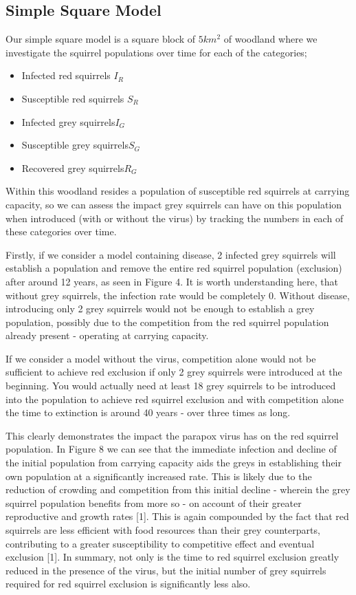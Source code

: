 \documentclass{article}
\begin{document}
\subsection{\textbf{Simple Square Model}}

Our simple square model is a square block of $5km^{2}$ of woodland where we investigate the squirrel populations over time for each of the categories; 

\begin{itemize}
\item Infected red squirrels $I_{R}$
\item Susceptible red squirrels $S_{R}$
\item Infected grey squirrels$I_{G}$
\item Susceptible grey squirrels$S_{G}$
\item Recovered grey squirrels$R_{G}$
\end{itemize}

Within this woodland resides a population of susceptible red squirrels at carrying capacity, so we can assess the impact grey squirrels can have on this population when introduced (with or without the virus) by tracking the numbers in each of these categories over time.

Firstly, if we consider a model containing disease, 2 infected grey squirrels will establish a population and remove the entire red squirrel population (exclusion) after around 12 years, as seen in Figure 4. It is worth understanding here, that without grey squirrels, the infection rate would be completely 0. Without disease, introducing only 2 grey squirrels would not be enough to establish a grey population, possibly due to the competition from the red squirrel population already present - operating at carrying capacity. 

If we consider a model without the virus, competition alone would not be sufficient to achieve red exclusion if only 2 grey squirrels were introduced at the beginning. You would actually need at least 18 grey squirrels to be introduced into the population to achieve red squirrel exclusion and with competition alone the time to extinction is around 40 years - over three times as long.

This clearly demonstrates the impact the parapox virus has on the red squirrel population. In Figure 8 we can see that the immediate infection and decline of the initial population from carrying capacity aids the greys in establishing their own population at a significantly increased rate. This is likely due to the reduction of crowding and competition from this initial decline - wherein the grey squirrel population benefits from more so - on account of their greater reproductive and growth rates [1]. This is again compounded by the fact that red squirrels are less efficient with food resources than their grey counterparts, contributing to a greater susceptibility to competitive effect and eventual exclusion [1]. In summary, not only is the time to red squirrel exclusion greatly reduced in the presence of the virus, but the initial number of grey squirrels required for red squirrel exclusion is significantly less also.
\end{document}
